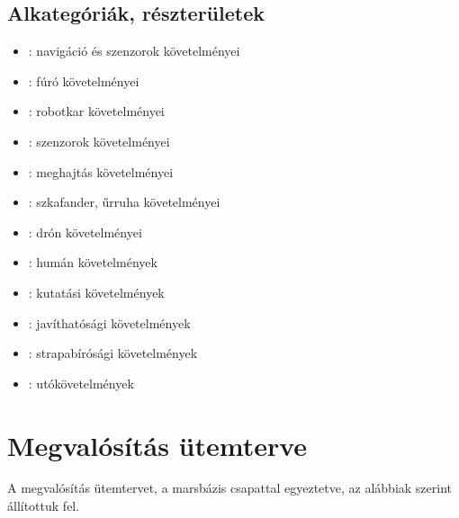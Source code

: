 \documentclass[12pt]{report}
\begin{document}
\subsection{Alkategóriák, részterületek}
\begin{itemize}
  \item {}: navigáció és szenzorok követelményei 
  \item {}: fúró követelményei
  \item {}: robotkar követelményei
  \item {}: szenzorok követelményei
  \item {}: meghajtás követelményei
  \item {}: szkafander, űrruha követelményei
  \item {}: drón követelményei
  \item {}: humán követelmények
  \item {}: kutatási követelmények
  \item {}: javíthatósági követelmények
  \item {}: strapabírósági követelmények
  \item {}: utókövetelmények
\end{itemize}




\section{Megvalósítás ütemterve}

A megvalósítás ütemtervet, a marsbázis csapattal egyeztetve, az alábbiak szerint állítottuk fel.
\end{document}

